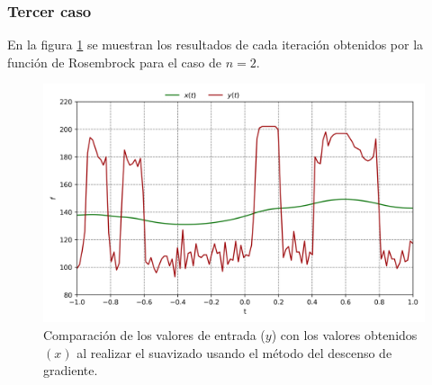 \subsubsection{Tercer caso}

En la figura \ref{fig:lambda_1000} se muestran los resultados de cada iteración obtenidos por la función de Rosembrock para el caso de $n=2$.

\begin{figure}[H]
    \centering
    \includegraphics[width=12cm]{Graphics/Problema_3/lambda_1000.png}
    \caption{Comparación de los valores de entrada ($y$) con los valores obtenidos $(x)$ al realizar el suavizado usando el método del descenso de gradiente.}
    \label{fig:lambda_1000}
\end{figure}